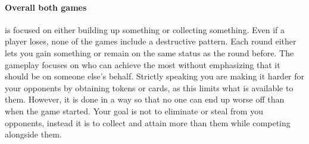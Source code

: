 \documentclass[a4paper]{article}
\begin{document}
\paragraph{Overall both games} is focused on either building up something or collecting something. 
Even if a player loses, none of the games include a destructive pattern. 
Each round either lets you gain something or remain on the same status as the round before. 
The gameplay focuses on who can achieve the most without emphasizing that it should be on someone else's behalf. 
Strictly speaking you are making it harder for your opponents by obtaining tokens or cards, as this limits what is available to them. 
However, it is done in a way so that no one can end up worse off than when the game started. 
Your goal is not to eliminate or steal from you opponents, instead it is to collect and attain more than them while competing alongside them.

\newpage


\end{document}

